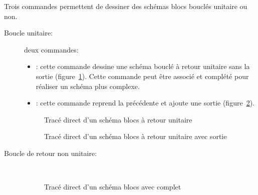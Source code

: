 \documentclass[a4paper,11pt]{article}                      %
\begin{document}
Trois commandes permettent de dessiner des schémas blocs bouclés unitaire ou non.
\begin{description} 
\item[Boucle unitaire: ]deux commandes:

\begin{itemize}
\item  {}: cette commande dessine une schéma bouclé à retour unitaire sans la sortie (figure~\ref{fig:retourunitaire}). Cette commande peut être associé et complété pour réaliser un schéma plus complexe.

 
\item {}: cette commande reprend la précédente et ajoute une sortie (figure~\ref{fig:retourunitairesortie}).

 
 \end{itemize}


\begin{figure}[!htb]
\centering
\begin{tikzexampleL}[title=,]
 \end{tikzexampleL}
\caption{Tracé direct d'un schéma blocs à retour unitaire}
\label{fig:retourunitaire}
\end{figure}



\begin{figure}[!htb]
\centering
\begin{tikzexampleL}[title=,]
 \end{tikzexampleL}
\caption{Tracé direct d'un schéma blocs à retour unitaire avec sortie}
\label{fig:retourunitairesortie}
\end{figure}




\item[Boucle de retour non unitaire: ] ~\\


\begin{figure}[!htb]
\centering
\begin{tikzexampleL}[title=,]
 \end{tikzexampleL}
\caption{Tracé direct d'un schéma blocs avec complet}
\label{fig:retourunitairecomplet}
\end{figure} 


\end{description}
\end{document}

